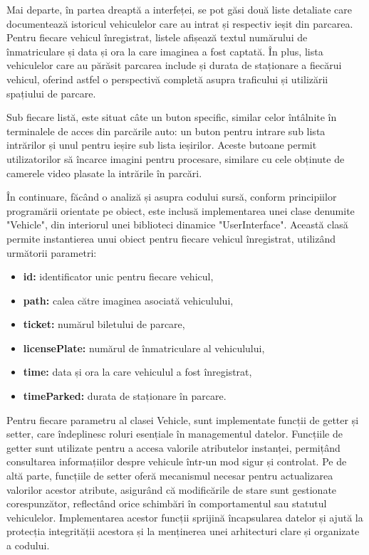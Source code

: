 \documentclass[a4paper,12pt]{report}
\begin{document}
Mai departe, în partea dreaptă a interfeței, se pot găsi două liste detaliate care documentează istoricul vehiculelor care au intrat și respectiv ieșit din parcarea. Pentru fiecare vehicul înregistrat, listele afișează textul numărului de înmatriculare și data și ora la care imaginea a fost captată. În plus, lista vehiculelor care au părăsit parcarea include și durata de staționare a fiecărui vehicul, oferind astfel o perspectivă completă asupra traficului și utilizării spațiului de parcare.

Sub fiecare listă, este situat câte un buton specific, similar celor întâlnite în terminalele de acces din parcările auto: un buton pentru intrare sub lista intrărilor și unul pentru ieșire sub lista ieșirilor. Aceste butoane permit utilizatorilor să încarce imagini pentru procesare, similare cu cele obținute de camerele video plasate la intrările în parcări.

În continuare, făcând o analiză și asupra codului sursă, conform principiilor programării orientate pe obiect, este inclusă implementarea unei clase denumite "Vehicle", din interiorul unei biblioteci dinamice "UserInterface". Această clasă permite instantierea unui obiect pentru fiecare vehicul înregistrat, utilizând următorii parametri:
\begin{itemize}
    \item \textbf{id:} identificator unic pentru fiecare vehicul,
    \item \textbf{path:} calea către imaginea asociată vehiculului,
    \item \textbf{ticket:} numărul biletului de parcare,
    \item \textbf{licensePlate:} numărul de înmatriculare al vehiculului,
    \item \textbf{time:} data și ora la care vehiculul a fost înregistrat,
    \item \textbf{timeParked:} durata de staționare în parcare.
\end{itemize}

Pentru fiecare parametru al clasei Vehicle, sunt implementate funcții de getter și setter, care îndeplinesc roluri esențiale în managementul datelor. Funcțiile de getter sunt utilizate pentru a accesa valorile atributelor instanței, permițând consultarea informațiilor despre vehicule într-un mod sigur și controlat. Pe de altă parte, funcțiile de setter oferă mecanismul necesar pentru actualizarea valorilor acestor atribute, asigurând că modificările de stare sunt gestionate corespunzător, reflectând orice schimbări în comportamentul sau statutul vehiculelor. Implementarea acestor funcții sprijină încapsularea datelor și ajută la protecția integrității acestora și la menținerea unei arhitecturi clare și organizate a codului.
\end{document}
